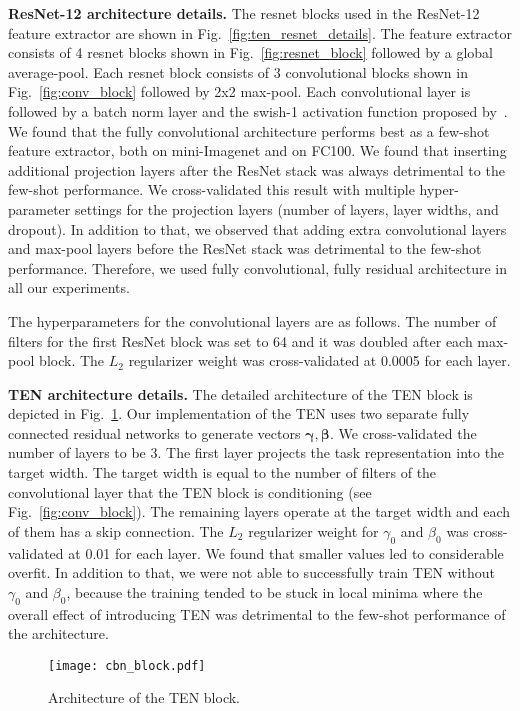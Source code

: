 \documentclass{article}
\begin{document}
\textbf{ResNet-12 architecture details.} The resnet blocks used in the ResNet-12 feature extractor are shown in Fig.~\ref{fig:ten_resnet_details}. The feature extractor consists of 4 resnet blocks shown in Fig.~\ref{fig:resnet_block} followed by a global average-pool. Each resnet block consists of 3 convolutional blocks shown in Fig.~\ref{fig:conv_block} followed by 2x2 max-pool. Each convolutional layer is followed by a batch norm layer and the swish-1 activation function proposed by~\citet{Ramachandran2017searching}. We found that the fully convolutional architecture performs best as a few-shot feature extractor, both on mini-Imagenet and on FC100. We found that inserting additional projection layers after the ResNet stack was always detrimental to the few-shot performance. We cross-validated this result with multiple hyper-parameter settings for the projection layers (number of layers, layer widths, and dropout). In addition to that, we observed that adding extra convolutional layers and max-pool layers before the ResNet stack was detrimental to the few-shot performance. Therefore, we used fully convolutional, fully residual architecture in all our experiments.

The hyperparameters for the convolutional layers are as follows. The number of filters for the first ResNet block was set to 64 and it was doubled after each max-pool block. The $L_2$ regularizer weight was cross-validated at 0.0005 for each layer.

\textbf{TEN architecture details.} The detailed architecture of the TEN block is depicted in Fig.~\ref{fig:tbn_block}. Our implementation of the TEN uses two separate fully connected residual networks to generate vectors $\bm{\gamma}, \bm{\beta}$. We cross-validated the number of layers to be 3. The first layer projects the task representation into the target width. The target width is equal to the number of filters of the convolutional layer that the TEN block is conditioning (see Fig.~\ref{fig:conv_block}). The remaining layers operate at the target width and each of them has a skip connection. The $L_2$ regularizer weight for $\gamma_0$ and $\beta_0$  was cross-validated at 0.01 for each layer. We found that smaller values led to considerable overfit. In addition to that, we were not able to successfully train TEN without $\gamma_0$ and $\beta_0$, because the training tended to be stuck in local minima where the overall effect of introducing TEN was detrimental to the few-shot performance of the architecture.

\begin{figure}[t]
    \centering
    \texttt{[image: cbn\_block.pdf]}
    \caption{Architecture of the TEN block.}
    \label{fig:tbn_block}
\end{figure}
\end{document}
